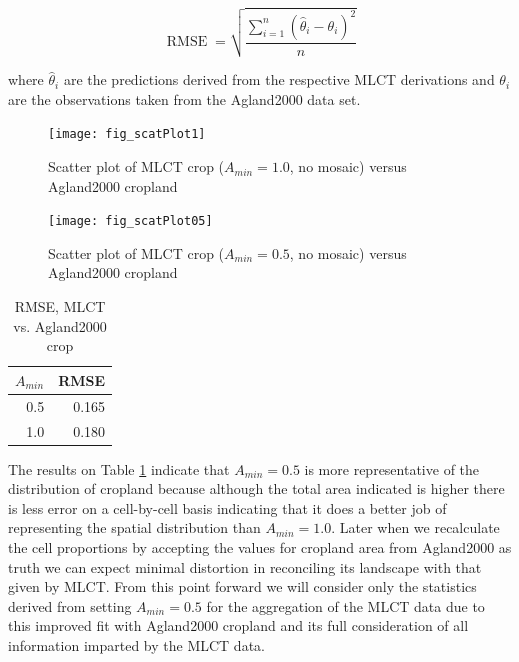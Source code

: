 $$
\operatorname{RMSE}=\sqrt{\frac{\sum_{i=1}^{n}(\hat\theta_i-\theta_i )^2}{n}}
$$

where $\hat\theta_i$ are the predictions derived from the respective
MLCT derivations and $\theta_i$ are the observations taken from the
Agland2000 data set.



\begin{figure}[hpt]
  \begin{center} 


\texttt{[image: fig\_scatPlot1]}
  \end{center} 
  \caption{Scatter plot of MLCT crop ($A_{min}=1.0$, no mosaic) versus Agland2000 cropland}
  \label{fig:scatplot1} 
\end{figure} 

\begin{figure}[hpt]
  \begin{center} 



\texttt{[image: fig\_scatPlot05]}
  \end{center} 
  \caption{Scatter plot of MLCT crop ($A_{min}=0.5$, no mosaic) versus Agland2000 cropland}
  \label{fig:scatplot05} 
\end{figure} 

\begin{table}[ht]
\begin{center}
\begin{tabular}{rr}
  \hline
$A_{min}$ & RMSE \\ 
  \hline
0.5 & 0.165 \\ 
  1.0 & 0.180 \\ 
   \hline
\end{tabular}
\caption{RMSE, MLCT vs. Agland2000 crop}
\label{tab:rmse}
\end{center}
\end{table}
The results on Table \ref{tab:rmse} indicate that $A_{min}=0.5$ is
more representative of the distribution of cropland because although
the total area indicated is higher there is less error on a
cell-by-cell basis indicating that it does a better job of
representing the spatial distribution than $A_{min}=1.0$.  Later when
we recalculate the cell proportions by accepting the values for
cropland area from Agland2000 as truth we can expect minimal
distortion in reconciling its landscape with that given by MLCT.  From
this point forward we will consider only the statistics derived from
setting $A_{min}=0.5$ for the aggregation of the MLCT data due to this
improved fit with Agland2000 cropland and its full consideration of
all information imparted by the MLCT data.


